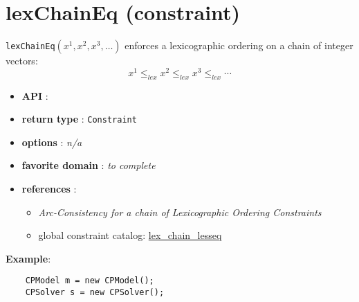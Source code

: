 \label{lexchaineq}
\hypertarget{lexchaineq}{}

\section{lexChainEq (constraint)}\label{lexchaineq:lexchaineqconstraint}\hypertarget{lexchaineq:lexchaineqconstraint}{}
\begin{notedef}
\texttt{lexChainEq}$(x^1 ,x^2 ,x^3,\ldots)$ enforces a lexicographic ordering on a chain of integer vectors:
$$x^1 \le_{lex} x^2 \le_{lex} x^3 \le_{lex}\cdots$$
\end{notedef}

\begin{itemize}
	\item \textbf{API} : 
	\item \textbf{return type} : \texttt{Constraint}
	\item \textbf{options} : \emph{n/a}
	\item \textbf{favorite domain} : \emph{to complete}
	\item \textbf{references} :
      \begin{itemize}
      \item \cite{BeldiceanuSICS02} \emph{Arc-Consistency for a chain of Lexicographic Ordering Constraints} 
      \item global constraint catalog: \href{http://www.emn.fr/x-info/sdemasse/gccat/Clex_chain_lesseq.html}{lex\_chain\_lesseq}
      \end{itemize}
\end{itemize}

\textbf{Example}:
\begin{lstlisting}
	CPModel m = new CPModel();                                 
	CPSolver s = new CPSolver();
\end{lstlisting}
